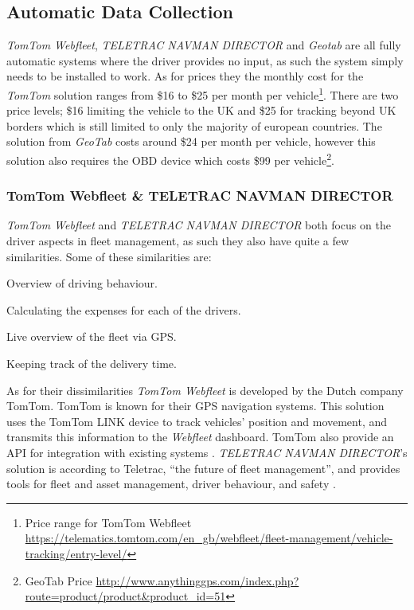 \subsection{Automatic Data Collection}%
\textit{TomTom Webfleet}, \textit{TELETRAC NAVMAN DIRECTOR} and \textit{Geotab} are all fully automatic systems where the driver provides no input, as such the system simply needs to be installed to work.
As for prices they the monthly cost for the \textit{TomTom} solution ranges from \$16 to \$25 per month per vehicle\footnote{Price range for TomTom Webfleet\\ \url{https://telematics.tomtom.com/en_gb/webfleet/fleet-management/vehicle-tracking/entry-level/}}.
There are two price levels; \$16 limiting the vehicle to the UK and \$25 for tracking beyond UK borders which is still limited to only the majority of european countries.
The solution from \textit{GeoTab} costs around \$24 per month per vehicle, however this solution also requires the OBD device which costs \$99 per vehicle\footnote{GeoTab Price \url{http://www.anythinggps.com/index.php?route=product/product&product_id=51}}.

\subsubsection{TomTom Webfleet \& TELETRAC NAVMAN DIRECTOR}
\textit{TomTom Webfleet} and \textit{TELETRAC NAVMAN DIRECTOR} both focus on the driver aspects in fleet management, as such they also have quite a few similarities.
Some of these similarities are:
\begin{description}
    \item Overview of driving behaviour.
    \item Calculating the expenses for each of the drivers.
    \item Live overview of the fleet via GPS.
    \item Keeping track of the delivery time.
\end{description}
As for their dissimilarities \textit{TomTom Webfleet} is developed by the Dutch company TomTom. TomTom is known for their GPS navigation systems. This solution uses the TomTom LINK device to track vehicles' position and movement, and transmits this information to the \textit{Webfleet} dashboard. TomTom also provide an API for integration with existing systems \cite{tomtom}.
\textit{TELETRAC NAVMAN DIRECTOR}'s solution is according to Teletrac, \enquote{the future of fleet management}, and provides tools for fleet and asset management, driver behaviour, and safety \cite{teletracnavman}.
